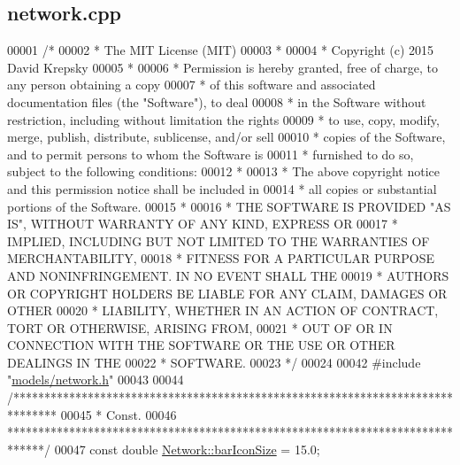 \hypertarget{network_8cpp_source}{}\subsection{network.\+cpp}
\label{network_8cpp_source}

\begin{DoxyCode}
00001 \textcolor{comment}{/*}
00002 \textcolor{comment}{ * The MIT License (MIT)}
00003 \textcolor{comment}{ *}
00004 \textcolor{comment}{ * Copyright (c) 2015 David Krepsky}
00005 \textcolor{comment}{ *}
00006 \textcolor{comment}{ * Permission is hereby granted, free of charge, to any person obtaining a copy}
00007 \textcolor{comment}{ * of this software and associated documentation files (the "Software"), to deal}
00008 \textcolor{comment}{ * in the Software without restriction, including without limitation the rights}
00009 \textcolor{comment}{ * to use, copy, modify, merge, publish, distribute, sublicense, and/or sell}
00010 \textcolor{comment}{ * copies of the Software, and to permit persons to whom the Software is}
00011 \textcolor{comment}{ * furnished to do so, subject to the following conditions:}
00012 \textcolor{comment}{ *}
00013 \textcolor{comment}{ * The above copyright notice and this permission notice shall be included in}
00014 \textcolor{comment}{ * all copies or substantial portions of the Software.}
00015 \textcolor{comment}{ *}
00016 \textcolor{comment}{ * THE SOFTWARE IS PROVIDED "AS IS", WITHOUT WARRANTY OF ANY KIND, EXPRESS OR}
00017 \textcolor{comment}{ * IMPLIED, INCLUDING BUT NOT LIMITED TO THE WARRANTIES OF MERCHANTABILITY,}
00018 \textcolor{comment}{ * FITNESS FOR A PARTICULAR PURPOSE AND NONINFRINGEMENT. IN NO EVENT SHALL THE}
00019 \textcolor{comment}{ * AUTHORS OR COPYRIGHT HOLDERS BE LIABLE FOR ANY CLAIM, DAMAGES OR OTHER}
00020 \textcolor{comment}{ * LIABILITY, WHETHER IN AN ACTION OF CONTRACT, TORT OR OTHERWISE, ARISING FROM,}
00021 \textcolor{comment}{ * OUT OF OR IN CONNECTION WITH THE SOFTWARE OR THE USE OR OTHER DEALINGS IN THE}
00022 \textcolor{comment}{ * SOFTWARE.}
00023 \textcolor{comment}{ */}
00024 
00042 \textcolor{preprocessor}{#include "\hyperlink{network_8h}{models/network.h}"}
00043 
00044 \textcolor{comment}{/*******************************************************************************}
00045 \textcolor{comment}{ * Const.}
00046 \textcolor{comment}{ ******************************************************************************/}
00047 \textcolor{keyword}{const} \textcolor{keywordtype}{double} \hyperlink{group___graphics_gaa334bbc93b3fde219840e95e23198b53}{Network::barIconSize} = 15.0;

\end{DoxyCode}

